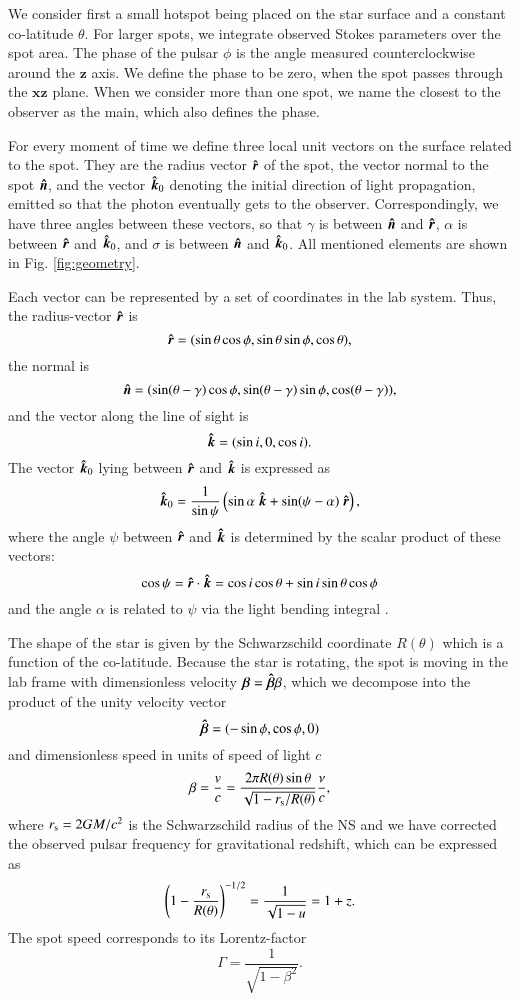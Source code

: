 \documentclass{aa}
\newcommand{\be}{\begin{equation}}
\newcommand{\ee}{\end{equation}}
\newcommand{\unit}[1]{\mbox{\boldmath $\hat{#1}$}}
\begin{document}
We consider first a small hotspot being placed on the star surface and a constant co-latitude $\theta$. 
For larger spots, we integrate observed Stokes parameters over the spot area. 
The phase of the pulsar $\phi$ is the angle measured counterclockwise around the $\bm z$ axis. 
We define the phase to be zero, when the spot passes through the $\bm{xz}$ plane. 
When we consider more than one spot, we name the closest to the observer as the main, which also defines the phase. 

For every moment of time we define three local unit vectors on the surface related to the spot.
They are the radius vector $\unit{r}$ of the spot, the vector normal to the spot $\unit{n}$, and the vector $\unit{k}_0$ denoting the initial direction of light propagation, emitted so that the photon eventually gets to the observer. 
Correspondingly, we have three angles between these vectors, so that $\gamma$ is between $\unit{n}$ and $\unit{r}$, $\alpha$  is between  $\unit{r}$ and $\unit{k}_0$, and $\sigma$  is between $\unit{n}$ and $\unit{k}_0$.
All mentioned elements are shown in Fig. \ref{fig:geometry}.

Each vector can be represented by a set of coordinates in the lab system. Thus, the radius-vector $\unit{r}$ is 
\be 
\unit{r}=(\sin\theta\cos\phi,\sin\theta\sin\phi,\cos\theta),
\ee
the normal is 
\be 
\unit{n}=(\sin(\theta-\gamma)\cos\phi,\sin(\theta-\gamma)\sin\phi,\cos(\theta-\gamma)),
\ee
and the vector along the line of sight is 
\be
	\unit{k}=(\sin i, 0 , \cos i).
\ee
The vector $\unit{k}_0$ lying between $\unit{r}$ and $\unit{k}$  is expressed as
\be\label{eq:kzero}
	\unit{k}_0=\frac{1}{\sin\psi}\left( \sin\alpha\  \unit{k}+\sin(\psi-\alpha)\ \unit{r}\right) ,  
\ee
where the angle $\psi$ between $\unit{r}$ and $\unit{k}$ is determined by the scalar product of these vectors: 
\be\label{eq:cospsi}
	\cos \psi = \unit{r} \cdot \unit{k} = 
	 \cos i \cos\theta + \sin i \sin\theta\cos\phi 
\ee
and the angle $\alpha$ is related to $\psi$ via the light bending integral \citep{PFC83,B02,SNP18,poutanen19}.


The shape of the star is given by the Schwarzschild coordinate $R(\theta)$ which is a function of the co-latitude.
Because the star is rotating, the spot is moving in the lab frame with dimensionless velocity $\bm{\beta}=\unit{\beta}  \beta$,
which we decompose into the product of the unity velocity vector 
\be\label{betahat}
	\unit{\beta} =(-\sin\phi,\cos\phi,0)
\ee
and dimensionless speed in units of speed of light $c$
\be
	\beta=\frac{v}{c} = \frac{2 \pi R(\theta) \sin\theta}{\sqrt{1-r_{\rm s}/R(\theta)}} \frac{\nu}{c},
\ee
where $r_{\rm s}=2GM/c^2$ is the Schwarzschild radius of the NS and we have corrected the observed pulsar frequency for gravitational redshift, which can be expressed as 
\be
	\left(1-\frac{r_{\rm s}}{R(\theta)} \right)^{-1/2}=\frac{1}{\sqrt{1-u}}=1+z.
\ee
The spot speed corresponds to its Lorentz-factor
\be\label{Lorentz-factor}
	\Gamma=\frac1{\sqrt{1-\beta^2}}.
\ee
\end{document}

